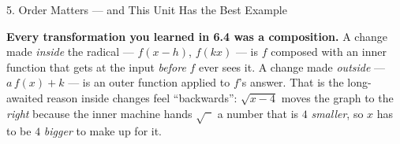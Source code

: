 \documentclass[10pt]{article}
\begin{document}
\begin{notesbox}{5. Order Matters --- and This Unit Has the Best Example}
\begin{center}
\begin{tcolorbox}[colback=forestbg, colframe=forest, boxrule=0.7pt, arc=1.5mm, width=0.94\linewidth,
    left=3mm, right=3mm, top=1.5mm, bottom=1.5mm]
\small \textbf{Every transformation you learned in 6.4 was a composition.} A change made
\emph{inside} the radical --- $f(x-h)$, $f(kx)$ --- is $f$ composed with an inner function that gets
at the input \emph{before} $f$ ever sees it. A change made \emph{outside} --- $a\,f(x)+k$ --- is an
outer function applied to $f$'s answer. That is the long-awaited reason inside changes feel
``backwards'': $\sqrt{x-4}$ moves the graph to the \emph{right} because the inner machine hands
$\sqrt{\phantom{x}}$ a number that is $4$ \emph{smaller}, so $x$ has to be $4$ \emph{bigger} to make
up for it.
\end{tcolorbox}
\end{center}
\end{notesbox}
\end{document}
